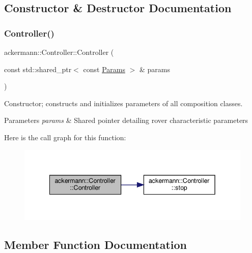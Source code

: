 \subsection{Constructor \& Destructor Documentation}
\mbox{\label{classackermann_1_1_controller_a4bf9f0657a103e0144ef14f9b8a7c96e}} 
\subsubsection{\texorpdfstring{Controller()}{Controller()}}
{\footnotesize\ttfamily ackermann\+::\+Controller\+::\+Controller (\begin{DoxyParamCaption}\item[{const std\+::shared\+\_\+ptr$<$ const \hyperlink{structackermann_1_1_params}{Params} $>$ \&}]{params }\end{DoxyParamCaption})\hspace{0.3cm}{\ttfamily [explicit]}}



Constructor; constructs and initializes parameters of all composition classes. 


\begin{DoxyParams}{Parameters}
{\em params} & Shared pointer detailing rover characteristic parameters \\
\hline
\end{DoxyParams}
Here is the call graph for this function\+:
\nopagebreak
\begin{figure}[H]
\begin{center}
\leavevmode
\includegraphics[width=342pt]{classackermann_1_1_controller_a4bf9f0657a103e0144ef14f9b8a7c96e_cgraph}
\end{center}
\end{figure}


\subsection{Member Function Documentation}
\mbox{\label{classackermann_1_1_controller_a4af9cff4fa372a7bd245fe50aaf05859}} 
